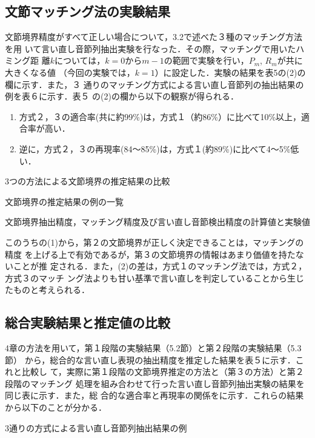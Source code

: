 \subsection{文節マッチング法の実験結果}
文節境界精度がすべて正しい場合について，3.2で述べた３種のマッチング方法を用
いて言い直し音節列抽出実験を行なった．その際，マッチングで用いたハミング距
離$k$については，$k=0$から$m-1$の範囲で実験を行い，$P_m$, $R_m$が共に大きくなる値
（今回の実験では，$k=1$）に設定した．実験の結果を表5の(2)の欄に示す．また，３
通りのマッチング方式による言い直し音節列の抽出結果の例を表６に示す．表５
の(2)の欄から以下の観察が得られる．
\Vspace
\begin{enumerate}
\item 方式２，３の適合率(共に約99\%)は，方式１（約86\%）に比べて10\%以上，適
合率が高い．
\item 逆に，方式２，３の再現率(84〜85\%)は，方式１(約89\%)に比べて4〜5\%低
い．
\end{enumerate}
\begin{table}[tbp]
\vspace{-3mm}
  \begin{center}
    \caption{3つの方法による文節境界の推定結果の比較}
    \label{tab:3}
    \bigskip
    \caption{文節境界の推定結果の例の一覧}
    \label{tab:4}
    \smallskip
{}
  \end{center}
\end{table}
\begin{table}[htbp]
  \begin{center}
    \caption{文節境界抽出精度，マッチング精度及び言い直し音節検出精度の計算値と実験値}
    \label{tab:5}
    \medskip
{}
  \end{center}
\end{table}
\bigskip

このうちの(1)から，第２の文節境界が正しく決定できることは，マッチングの精度
を上げる上で有効であるが，第３の文節境界の情報はあまり価値を持たないことが推
定される．また，(2)の差は，方式１のマッチング法では，方式２，方式３のマッチ
ング法よりも甘い基準で言い直しを判定していることから生じたものと考えられる．
\subsection{総合実験結果と推定値の比較}
4章の方法を用いて，第１段階の実験結果（5.2節）と第２段階の実験結果（5.3節）
から，総合的な言い直し表現の抽出精度を推定した結果を表５に示す．これと比較し
て，実際に第１段階の文節境界推定の方法と（第３の方法）と第２段階のマッチング
処理を組み合わせて行った言い直し音節列抽出実験の結果を同じ表に示す．また，総
合的な適合率と再現率の関係をに示す．これらの結果から以下のことが分かる．
\begin{table}[htbp]
  \begin{center}
    \caption{3通りの方式による言い直し音節列抽出結果の例}
    \label{tab:6}
  \end{center}
\end{table}

